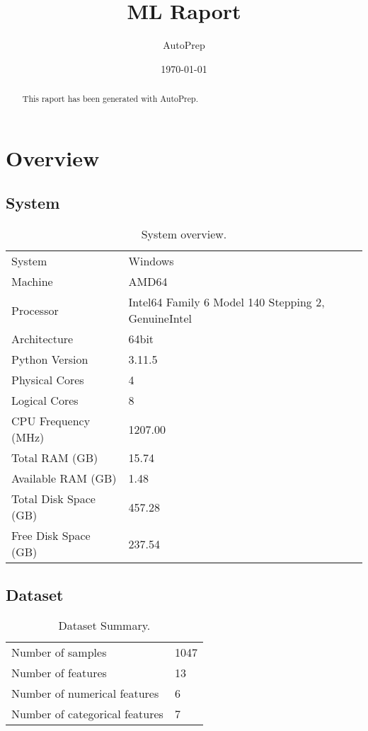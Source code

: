 \documentclass{article}%
\title{ML Raport}%
\author{AutoPrep}%
\date{\today}%
\begin{document}
%
\normalsize%
\maketitle%

    \begin{abstract}
    This raport has been generated with AutoPrep.
    \end{abstract}
\tableofcontents%
\newpage%
\section{Overview}%
\label{sec:Overview}%

%
\subsection{System}%
\label{subsec:System}%

%


\begin{table}[H]%
\begin{center}%
\begin{tabular}{l l}%
\hline%
System&Windows\\%
Machine&AMD64\\%
Processor&Intel64 Family 6 Model 140 Stepping 2, GenuineIntel\\%
Architecture&64bit\\%
Python Version&3.11.5\\%
Physical Cores&4\\%
Logical Cores&8\\%
CPU Frequency (MHz)&1207.00\\%
Total RAM (GB)&15.74\\%
Available RAM (GB)&1.48\\%
Total Disk Space (GB)&457.28\\%
Free Disk Space (GB)&237.54\\%
\hline%
\end{tabular}%
\end{center}%
\caption{System overview.}%
\end{table}

%
\subsection{Dataset}%
\label{subsec:Dataset}%

%


\begin{table}[H]%
\begin{center}%
\begin{tabular}{l l}%
\hline%
Number of samples&1047\\%
Number of features&13\\%
Number of numerical features&6\\%
Number of categorical features&7\\%
\hline%
\end{tabular}%
\end{center}%
\caption{Dataset Summary.}%
\end{table}
\end{document}
